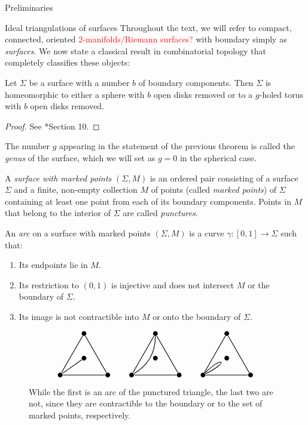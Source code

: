 \begin{chapter}{Preliminaries}
\begin{section}{Ideal triangulations of surfaces}
Throughout the text, we will refer to compact, connected, oriented \textcolor{red}{2-manifolds/Riemann surfaces?} with boundary simply as \emph{surfaces}. We now state a classical result in combinatorial topology that completely classifies these objects:

\begin{prop}\label{surf-classification} Let $\Sigma$ be a surface with a number $b$ of boundary components. Then $\Sigma$ is homeomorphic to either a sphere with $b$ open disks removed or to a $g$-holed torus with $b$ open disks removed.
\end{prop}
\begin{proof} See \cite{Mas77}*{Section 10}.
\end{proof}

The number $g$ appearing in the statement of the previous theorem is called the \emph{genus} of the surface, which we will set as $g=0$ in the spherical case.

A \emph{surface with marked points} $(\Sigma,M)$ is an ordered pair consisting of a surface $\Sigma$ and a finite, non-empty collection $M$ of points (called \emph{marked points}) of $\Sigma$ containing at least one point from each of its boundary components. Points in $M$ that belong to the interior of $\Sigma$ are called \emph{punctures}.

An \emph{arc} on a surface with marked points $(\Sigma, M)$ is a curve $\gamma:[0,1]\to \Sigma$ such that:
\begin{enumerate}
\item Its endpoints lie in $M$.
\item Its restriction to $(0,1)$ is injective and does not intersect $M$ or the boundary of $\Sigma$.
\item Its image is not contractible into $M$ or onto the boundary of $\Sigma$.
\end{enumerate}
\begin{figure}[h]
\[
\begin{tikzpicture}[thick]
\tikzstyle{every node} = [circle, fill=black, minimum size=.2cm, inner sep=0cm]
\node (se1) at (0,0) {};
\node (sw1) at (2,0) {}
	edge (se1);
\node (n1) at (1,1.73) {}
	edge (se1)
	edge (sw1);
\node (c1) at (1,0.7) {}
	edge (se1);

\node (se2) at (3,0) {};
\node (sw2) at (5,0) {}
	edge (se2);
\node (n2) at (4,1.73) {}
	edge (se2)
	edge (sw2)
	edge [bend left] (se2);
\node (c2) at (4,0.7) {};

\node (se3) at (6,0) {}
	edge [in=25, out=45, distance=1.1cm] (se3);
\node (sw3) at (8,0) {}
	edge (se3);
\node (n3) at (7,1.73) {}
	edge (se3)
	edge (sw3);
\node (c3) at (7,0.7) {};
\end{tikzpicture}
\]
\caption{While the first is an arc of the punctured triangle, the last two are not, since they are contractible to the boundary or to the set of marked points, respectively.}
\end{figure}


\end{section}
\end{chapter}
